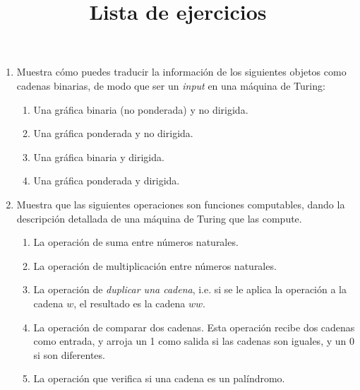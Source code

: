\documentclass[a4paper,12pt]{article}
\title{Lista de ejercicios}
\author{}
\date{}
\theoremstyle{definition}
\begin{document}
\maketitle
\vspace{.25in}

\begin{enumerate}
    \item Muestra cómo puedes traducir la información de los siguientes objetos como cadenas binarias, de modo que ser un \textit{input} en una máquina de Turing:
        \begin{enumerate}
            \item Una gráfica binaria (no ponderada) y no dirigida.
            \item Una gráfica ponderada y no dirigida.
            \item Una gráfica binaria y dirigida.
            \item Una gráfica ponderada y dirigida.
        \end{enumerate}

    \item Muestra que las siguientes operaciones son funciones computables, dando la descripción detallada de una máquina de Turing que las compute.
        \begin{enumerate}
            \item La operación de suma entre números naturales.
            \item La operación de multiplicación entre números naturales.
            \item La operación de \textit{duplicar una cadena}, i.e. si se le aplica la operación a la cadena $w$, el resultado es la cadena $ww$.
            \item La operación de comparar dos cadenas. Esta operación recibe dos cadenas como entrada, y arroja un 1 como salida si las cadenas son iguales, y un 0 si son diferentes. 
            \item La operación que verifica si una cadena es un palíndromo.
        \end{enumerate}


\end{enumerate}
\end{document}
